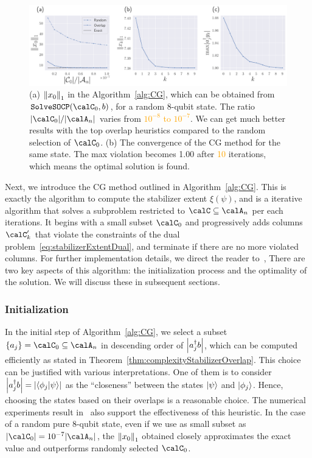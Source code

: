 \documentclass[a4paper, onecolumn, 11pt, longbibliography]{quantumarticle}
\newcommand{\orange}[1]{\textcolor{orange}{#1}}
\begin{document}
\begin{figure}[t]
  \centering
  \includegraphics[width=\columnwidth]{../../image/CG_7.pdf}
  \caption{
    (a) $\norm{x_0}_1$ in the Algorithm~\ref{alg:CG},
    which can be obtained from $\texttt{SolveSOCP}(\calC_0, b)$,
    for a random 8-qubit state.
    The ratio $\abs{\calC_0}/\abs{\calA_n}$
    varies from \orange{$10^{-8}$ to $10^{-7}$}.
    We can get much better results
    with the top overlap heuristics
    compared to the random selection of $\calC_0$.
    (b) The convergence of the CG method
    for the same state.
    The max violation becomes 1.00
    after \orange{10} iterations, which means
    the optimal solution is found.
  }
  \label{fig:CG}
\end{figure}

Next, we introduce the CG method
outlined in Algorithm~\ref{alg:CG}.
This is exactly the algorithm to compute
the stabilizer extent $\xi(\psi)$,
and is a iterative algorithm that solves
a subproblem restricted to $\calC \subseteq \calA_n$
per each iterations.
It begins with a small subset $\calC_0$
and progressively adds columns $\calC'_k$
that violate the constraints of the dual problem~\eqref{eq:stabilizerExtentDual},
and terminate if there are no more violated columns.
For further implementation details,
we direct the reader
to~\cite{hamaguchiHandbookEfficientlyQuantifying2023},
There are two key aspects of this algorithm:
the initialization process and
the optimality of the solution.
We will discuss these
in subsequent sections.

\subsubsection{Initialization}

In the initial step of Algorithm~\ref{alg:CG},
we select a subset $\{a_j\} = \calC_0 \subseteq \calA_n$
in descending order of $\abs{a_j^\dagger b}$,
which can be computed efficiently
as stated in Theorem~\ref{thm:complexityStabilizerOverlap}.
This choice can be justified with various interpretations.
One of them is to consider
$\abs{a_j^\dagger b} = \abs{\braket{\phi_j}{\psi}}$
as the ``closeness'' between the states
$\ket{\psi}$ and $\ket{\phi_j}$.
Hence, choosing the states based on their overlaps
is a reasonable choice.
The numerical experiments result
in~\cite{hamaguchiHandbookEfficientlyQuantifying2023}
also support the effectiveness of this heuristic.
In the case of a random pure 8-qubit state,
even if we use as small subset as
$\abs{\calC_0} = 10^{-7} \abs{\calA_n}$,
the $\norm{x_0}_1$ obtained closely approximates the exact value
and outperforms randomly selected $\calC_0$.
\end{document}
